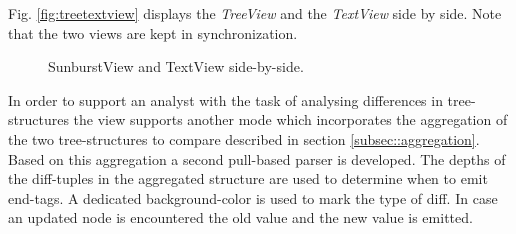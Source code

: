 \begin{itemize}
Fig. \ref{fig:treetextview} displays the \emph{TreeView} and the \emph{TextView} side by side. Note that the two views are kept in synchronization.

\begin{figure}[tb]
\caption{\label{fig:sunbursttextview} SunburstView and TextView side-by-side.}
\end{figure}

In order to support an analyst with the task of analysing differences in tree-structures the view supports another mode which incorporates the aggregation of the two tree-structures to compare described in section \ref{subsec::aggregation}. Based on this aggregation a second pull-based parser is developed. The depths of the diff-tuples in the aggregated structure are used to determine when to emit end-tags. A dedicated background-color is used to mark the type of diff. In case an updated node is encountered the old value and the new value is emitted.%


\end{itemize}
